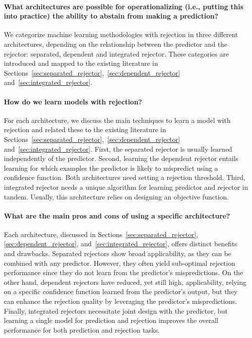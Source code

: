 \paragraph{What architectures are possible for operationalizing (i.e., putting this into practice) the ability to abstain from making a prediction?}
We categorize machine learning methodologies with rejection in three different architectures, depending on the relationship between the predictor and the rejector: separated, dependent and integrated rejector. These categories are introduced and mapped to the existing literature in Sections~\ref{sec:separated_rejector},~\ref{sec:dependent_rejector} and~\ref{sec:integrated_rejector}. 

\paragraph{How do we learn models with rejection?}
For each architecture, we discuss the main techniques to learn a model with rejection and related these to the existing literature in Sections~\ref{sec:separated_rejector},~\ref{sec:dependent_rejector} and~\ref{sec:integrated_rejector}. 
First, the separated rejector is usually learned independently of the predictor.
Second, learning the dependent rejector entails learning for which examples the predictor is likely to mispredict using a confidence function. Both architectures need setting a rejection threshold.
Third, integrated rejector needs a unique algorithm for learning predictor and rejector in tandem. Usually, this architecture relies on designing an objective function.

\paragraph{What are the main pros and cons of using a specific architecture?}
Each architecture, discussed in Sections~\ref{sec:separated_rejector},\ref{sec:dependent_rejector}, and~\ref{sec:integrated_rejector}, offers distinct benefits and drawbacks. Separated rejectors show broad applicability, as they can be combined with any predictor. However, they often yield sub-optimal rejection performance since they do not learn from the predictor's mispredictions. On the other hand, dependent rejectors have reduced, yet still high, applicability, relying on a specific confidence function learned from the predictor's output, but they can enhance the rejection quality by leveraging the predictor's mispredictions. Finally, integrated rejectors necessitate joint design with the predictor, but learning a single model for prediction and rejection improves the overall performance for both prediction and rejection tasks.

